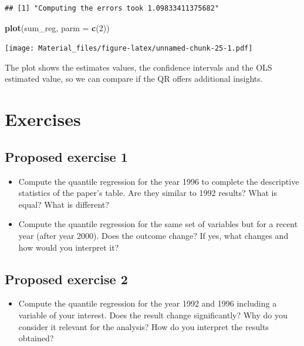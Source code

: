 \documentclass[]{book}
\newenvironment{Shaded}{\begin{snugshade}}{\end{snugshade}}
\newcommand{\KeywordTok}[1]{\textcolor[rgb]{0.13,0.29,0.53}{\textbf{#1}}}
\newcommand{\DataTypeTok}[1]{\textcolor[rgb]{0.13,0.29,0.53}{#1}}
\newcommand{\DecValTok}[1]{\textcolor[rgb]{0.00,0.00,0.81}{#1}}
\newcommand{\NormalTok}[1]{#1}
\providecommand{\tightlist}{%
  \setlength{\itemsep}{0pt}\setlength{\parskip}{0pt}}
\begin{document}
\begin{verbatim}
## [1] "Computing the errors took 1.09833411375682"
\end{verbatim}

\begin{Shaded}
\begin{Highlighting}[]
\KeywordTok{plot}\NormalTok{(sum_reg, }\DataTypeTok{parm =} \KeywordTok{c}\NormalTok{(}\DecValTok{2}\NormalTok{))}
\end{Highlighting}
\end{Shaded}

\texttt{[image: Material\_files/figure-latex/unnamed-chunk-25-1.pdf]}

The plot shows the estimates values, the confidence intervals and the
OLS estimated value, so we can compare if the QR offers additional
insights.

\section{Exercises}\label{exercises}

\subsection{Proposed exercise 1}\label{proposed-exercise-1}

\begin{itemize}
\tightlist
\item
  Compute the quantile regression for the year 1996 to complete the
  descriptive statistics of the paper's table. Are they similar to 1992
  results? What is equal? What is different?
\item
  Compute the quantile regression for the same set of variables but for
  a recent year (after year 2000). Does the outcome change? If yes, what
  changes and how would you interpret it?
\end{itemize}

\subsection{Proposed exercise 2}\label{proposed-exercise-2}

\begin{itemize}
\tightlist
\item
  Compute the quantile regression for the year 1992 and 1996 including a
  variable of your interest. Does the result change significantly? Why
  do you consider it relevant for the analysis? How do you interpret the
  results obtained?
\end{itemize}
\end{document}
